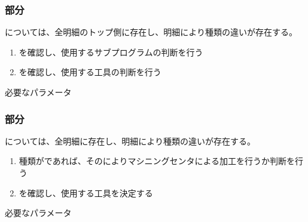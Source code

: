 \subsubsection{\Keyway 部分}
\KeywayMilling については、全明細のトップ側に存在し、明細により種類の違いが存在する。
\begin{enumerate}[label=\sarrow]
\item \nameKeywayType を確認し、使用するサブプログラムの判断を行う
\item \nameKeywayWidth を確認し、使用する工具の判断を行う
\end{enumerate}
\begin{Parameter}{必要なパラメータ}
\PMKeywayType%
\PMTopOutcutExists%
\PMKeywayWidth%
\end{Parameter}

\clearpage
\subsubsection{\EndFaceChamfer 部分}
\EndFaceChamferMilling については、全明細に存在し、明細により種類の違いが存在する。
\begin{enumerate}[label=\sarrow]
\item 種類が\EndFaceCChamfer であれば、その\EndFaceCChamferLength によりマシニングセンタによる加工を行うか判断を行う
\item \EndFaceCChamferAngle を確認し、使用する工具を決定する
\end{enumerate}
\begin{Parameter}{必要なパラメータ}
\PMChamferType%
\PMTopEndFaceOutCChamferLength
\PMTopEndFaceOutCChamferAngle%
\PMTopOutcutExists\\
\PMBottomEndFaceOutCChamferLength%
\PMBottomEndFaceOutCChamferAngle%
\PMBottomOutcutExists%
\end{Parameter}

